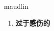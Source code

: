 
\begin{frame}
{\huge maudlin}
\begin{center}
\begin{enumerate}\Large
  \item \textbf{过于感伤的}
\end{enumerate}
\end{center}
\end{frame}
